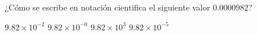
\question ¿Cómo se escribe en notación cientifica el siguiente valor
  $0.0000982$?

  \begin{oneparchoices}
    \choice $9.82\times10^{-2}$
    \choice $9.82\times10^{-0}$
    \choice $9.82\times10^{3}$
    \CorrectChoice $9.82\times10^{-5}$
  \end{oneparchoices}
  \answerline[D]
